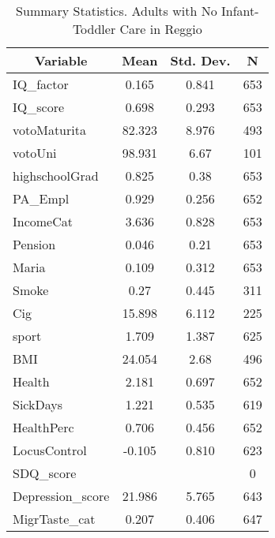 
\begin{table}[htbp]\centering \caption{Summary Statistics. Adults with No Infant-Toddler Care in Reggio \label{bothAdultasiloNoneReggio}}
\begin{tabular}{l c c  c}\hline\hline
\multicolumn{1}{c}{\textbf{Variable}} & \textbf{Mean}
 & \textbf{Std. Dev.} & \textbf{N}\\ \hline
IQ\_factor & 0.165 & 0.841  & 653\\
IQ\_score & 0.698 & 0.293  & 653\\
votoMaturita & 82.323 & 8.976  & 493\\
votoUni & 98.931 & 6.67  & 101\\
highschoolGrad & 0.825 & 0.38  & 653\\
PA\_Empl & 0.929 & 0.256  & 652\\
IncomeCat & 3.636 & 0.828  & 653\\
Pension & 0.046 & 0.21  & 653\\
Maria & 0.109 & 0.312  & 653\\
Smoke & 0.27 & 0.445  & 311\\
Cig & 15.898 & 6.112  & 225\\
sport & 1.709 & 1.387  & 625\\
BMI & 24.054 & 2.68  & 496\\
Health & 2.181 & 0.697  & 652\\
SickDays & 1.221 & 0.535  & 619\\
HealthPerc & 0.706 & 0.456  & 652\\
LocusControl & -0.105 & 0.810  & 623\\
SDQ\_score &  &   & 0\\
Depression\_score & 21.986 & 5.765  & 643\\
MigrTaste\_cat & 0.207 & 0.406  & 647\\
\hline\end{tabular}
\end{table}
